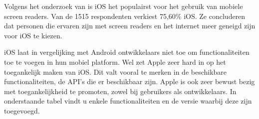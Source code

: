 
Volgens het onderzoek van \textcite{webAIMSurvey} is iOS het populairst voor het gebruik van mobiele screen readers. Van de 1515 respondenten verkiest 75,60\% iOS. Ze concluderen dat personen die ervaren zijn met screen readers en het internet meer geneigd zijn voor iOS te kiezen. 

iOS laat in vergelijking met Android ontwikkelaars niet toe om functionaliteiten toe te voegen in hun mobiel platform. Wel zet Apple zeer hard in op het toegankelijk maken van iOS. Dit valt vooral te merken in de beschikbare functionaliteiten, de \gls{API}'s die er beschikbaar zijn. Apple is ook zeer bewust bezig met toegankelijkheid te promoten, zowel bij gebruikers als ontwikkelaars. In onderstaande tabel vindt u enkele functionaliteiten en de versie waarbij deze zijn toegevoegd.
